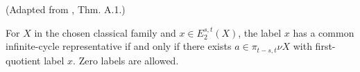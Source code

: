 \begin{theorem}
\label{frontier:Literature:e0657653596f}
(Adapted from \cite{BHS}, Thm. A.1.)\par{}

For $X$ in the chosen classical family and $x\in E_2^{s,t}(X)$, the label $x$ has a common infinite-cycle representative if and only if there exists $a\in\pi_{t-s,t}\nu X$ with first-quotient label $x$. Zero labels are allowed.
\end{theorem}

